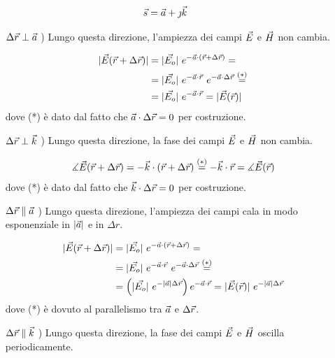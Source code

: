 	\begin{equation*}
		\vec{s} = \vec{a} + \jmath \vec{k}
	\end{equation*}

	\begin{itemize}
		\item[$\Delta\vec{r} \perp \vec{a}$ )] Lungo questa direzione, l'ampiezza dei campi $\vec{E}$ e $\vec{H}$ non cambia.

		\begin{equation*}
			\begin{split}
				|\vec{E}(\vec{r} + \Delta\vec{r})| &= |\vec{E_o}| ~ e^{-\vec{a} \cdot (\vec{r} + \Delta\vec{r})} = \\
				& = |\vec{E_o}| ~ e^{-\vec{a} \cdot \vec{r}} ~ e^{-\vec{a} \cdot \Delta\vec{r}} \stackrel{(*)}{=} \\
				& = |\vec{E_o}| ~ e^{-\vec{a} \cdot \vec{r}} = |\vec{E}(\vec{r})|
			\end{split}
		\end{equation*}
		dove (*) è dato dal fatto che $\vec{a} \cdot \Delta\vec{r} = 0$ per costruzione.

		\item[$\Delta\vec{r} \perp \vec{k}$ )] Lungo questa direzione, la fase dei campi $\vec{E}$ e $\vec{H}$ non cambia.

		\begin{equation*}
				\measuredangle \vec{E}(\vec{r} + \Delta\vec{r}) = -\vec{k} \cdot (\vec{r} + \Delta\vec{r}) \stackrel{(*)}{=} - \vec{k} \cdot \vec{r} = \measuredangle \vec{E}(\vec{r})
		\end{equation*}
		dove (*) è dato dal fatto che $\vec{k} \cdot \Delta\vec{r} = 0$ per costruzione.

		\item[$\Delta\vec{r} \parallel \vec{a}$ )] Lungo questa direzione, l'ampiezza dei campi cala in modo esponenziale in $|\vec{a}|$ e in $\Delta r$.

		\begin{equation*}
			\begin{split}
				|\vec{E}(\vec{r} + \Delta\vec{r})| &= |\vec{E_o}| ~ e^{-\vec{a} \cdot (\vec{r} + \Delta\vec{r})} = \\
				& = |\vec{E_o}| ~ e^{-\vec{a} \cdot \vec{r}} ~ e^{-\vec{a} \cdot \Delta\vec{r}} \stackrel{(*)}{=} \\
				& = \left( |\vec{E_o}| ~ e^{-|\vec{a}| \Delta\vec{r}} \right) e^{-\vec{a} \cdot \vec{r}} = |\vec{E}(\vec{r})| ~ e^{-|\vec{a}| \Delta\vec{r}}
			\end{split}
		\end{equation*}
		dove (*) è dovuto al parallelismo tra $\vec{a}$ e $\Delta\vec{r}$.

		\item[$\Delta\vec{r} \parallel \vec{k}$ )] Lungo questa direzione, la fase dei campi $\vec{E}$ e $\vec{H}$ oscilla periodicamente.


\end{itemize}
